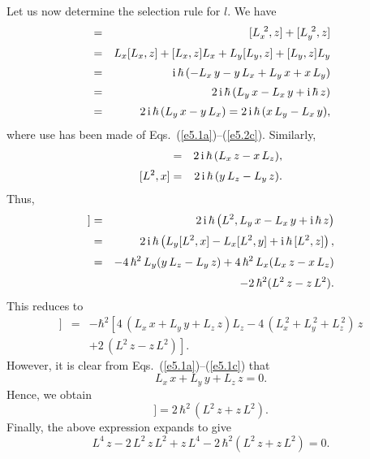 Let us now determine the selection rule for $l$. We have
\begin{eqnarray}
[L^2, z] &=& [L_x^{~2}, z] + [L_y^{~2}, z] \nonumber\\[0.5ex]
         &=& L_x[L_x, z] + [L_x, z] L_x + L_y[L_y, z] + [L_y, z] L_y\nonumber\\[0.5ex]
         &=& {\rm i}\,\hbar\left( -L_x\, y - y\, L_x + L_y \,x + x \,L_y\right)\nonumber\\[0.5ex]
         &=& 2 \,{\rm i} \, \hbar \,( L_y \,x - L_x \,y + {\rm i}\,\hbar\,z)\nonumber\\[0.5ex]
	 &=& 2 \,{\rm i}\, \hbar \,( L_y\, x - y \,L_x ) =  2\, {\rm i}\, \hbar\,
 ( x\, L_y - L_x \,y),
\end{eqnarray}
where use has been made of Eqs.~(\ref{e5.1a})--(\ref{e5.2c}). 
Similarly, 
\begin{eqnarray}
[L^2, y] &=& 2\,{\rm i}\, \hbar \,(  L_x\, z  - x\, L_z  ),\\[0.5ex]
[L^2, x] &=& 2\,{\rm i}\, \hbar\, ( y \,L_z - L_y \,z).
\end{eqnarray}
Thus,
\begin{eqnarray}
[L^2, [L^2, z]] &=& 2 \,{\rm i} \, \hbar \left( L^2, L_y \,x - L_x\, y + {\rm i}\,\hbar\,z
\right)\nonumber\\[0.5ex]
&=& 2\,{\rm i}\,\hbar \left( L_y [L^2, x] - L_x [ L^2, y] + {\rm i}\,\hbar\,
[L^2, z]\right),\nonumber\\[0.5ex]
&=& - 4\, \hbar^2 \,L_y(y\, L_z - L_y \,z) + 4\,\hbar^2 \,L_x(L_x\, z - x\, L_z)\nonumber \\[0.5ex]
&&- 2\, \hbar^2(L^2 \,z - z\, L^2).
\end{eqnarray}
This reduces to
\begin{eqnarray}
[L^2, [L^2, z]] &=& - \hbar^2 \left[4\,(L_x\, x + L_y \,y + L_z \,z) L_z - 4\,
(L_x^{~2} + L_y^{~2} + L_z^{~2})\, z\right. \nonumber\\[0.5ex]
&&\left. + 2 \,(L^2\, z - z\, L^2)\right].
\end{eqnarray}
However, it is clear from Eqs.~(\ref{e5.1a})--(\ref{e5.1c}) that
\begin{equation}
L_x \,x + L_y \,y + L_z \,z = 0.
\end{equation}
Hence, we obtain
\begin{equation}
[L^2, [L^2, z]] = 2 \,\hbar^2\, (L^2\, z + z \,L^2).
\end{equation}
Finally, the above expression expands to give
\begin{equation}\label{e6.50}
L^4 \,z - 2\, L^2 \,z\, L^2 + z\, L^4 - 2\, \hbar^2 (L^2 \,z +z \,L^2) = 0.
\end{equation}

